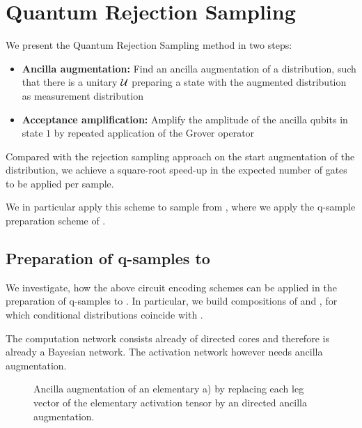 \section{Quantum Rejection Sampling}\label{sec:sampling}

We present the Quantum Rejection Sampling method in two steps:
\begin{itemize}
    \item {\bf Ancilla augmentation:} Find an ancilla augmentation of a distribution, such that there is a unitary $\mathcal{U}$ preparing a state with the augmented distribution as measurement distribution
    \item {\bf Acceptance amplification:} Amplify the amplitude of the ancilla qubits in state $1$ by repeated application of the Grover operator
\end{itemize}
Compared with the rejection sampling approach on the start augmentation of the distribution, we achieve a square-root speed-up in the expected number of gates to be applied per sample.

We in particular apply this scheme to sample from \ComputationActivationNetworks{}, where we apply the q-sample preparation scheme of .


\subsection{Preparation of q-samples to \CompActNets{}}\label{sec:canQSample}


We investigate, how the above circuit encoding schemes can be applied in the preparation of q-samples to \ComputationActivationNetworks{}.
In particular, we build compositions of \computationCircuits{} and \activationCircuits{}, for which conditional distributions coincide with \ComputationActivationNetworks{}.

The computation network consists already of directed cores and therefore is already a Bayesian network.
The activation network however needs ancilla augmentation.

\begin{figure}[t]
    \begin{center}
        
    \end{center}
    \caption{Ancilla augmentation of an elementary \ComputationActivationNetwork{} a) by replacing each leg vector of the elementary activation tensor by an directed ancilla augmentation.}
    \label{fig:canElementaryAugmentation}
\end{figure}

